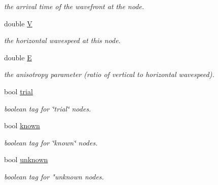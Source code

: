\begin{DoxyCompactItemize}
\begin{DoxyCompactList}\small\item\em the arrival time of the wavefront at the node. \end{DoxyCompactList}\item 
\hypertarget{class_node_a5e29eb2082f268ec5ac6fd5283efeaff}{}double \hyperlink{class_node_a5e29eb2082f268ec5ac6fd5283efeaff}{V}\label{class_node_a5e29eb2082f268ec5ac6fd5283efeaff}

\begin{DoxyCompactList}\small\item\em the horizontal wavespeed at this node. \end{DoxyCompactList}\item 
\hypertarget{class_node_af520653e3757cb51df0ca39e1bd23334}{}double \hyperlink{class_node_af520653e3757cb51df0ca39e1bd23334}{E}\label{class_node_af520653e3757cb51df0ca39e1bd23334}

\begin{DoxyCompactList}\small\item\em the anisotropy parameter (ratio of vertical to horizontal wavespeed). \end{DoxyCompactList}\item 
\hypertarget{class_node_ac45899b8aec5b70fed4cfd741b50a313}{}bool \hyperlink{class_node_ac45899b8aec5b70fed4cfd741b50a313}{trial}\label{class_node_ac45899b8aec5b70fed4cfd741b50a313}

\begin{DoxyCompactList}\small\item\em boolean tag for \char`\"{}trial\char`\"{} nodes. \end{DoxyCompactList}\item 
\hypertarget{class_node_a90742c509f7ec1df45564ca84602777a}{}bool \hyperlink{class_node_a90742c509f7ec1df45564ca84602777a}{known}\label{class_node_a90742c509f7ec1df45564ca84602777a}

\begin{DoxyCompactList}\small\item\em boolean tag for \char`\"{}known\char`\"{} nodes. \end{DoxyCompactList}\item 
\hypertarget{class_node_ad3025b3e4fbfde2644217c6e2099a4ae}{}bool \hyperlink{class_node_ad3025b3e4fbfde2644217c6e2099a4ae}{unknown}\label{class_node_ad3025b3e4fbfde2644217c6e2099a4ae}

\begin{DoxyCompactList}\small\item\em boolean tag for "unknown nodes. \end{DoxyCompactList}\end{DoxyCompactItemize}


